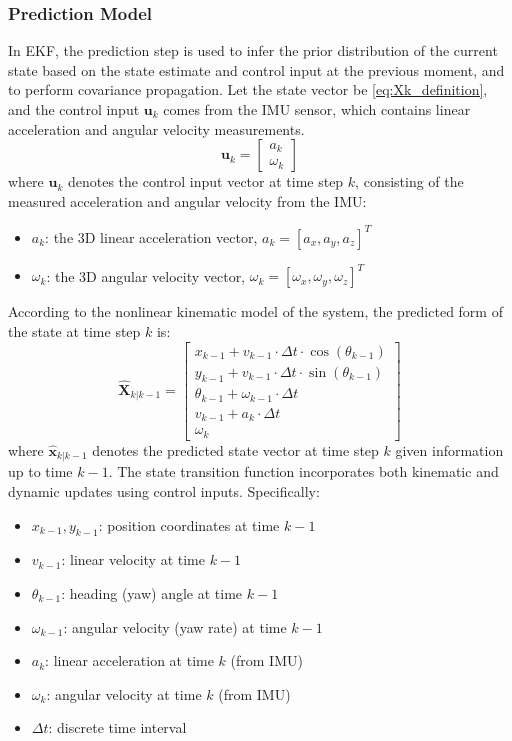 \documentclass[12pt,a4paper]{article}
\numberwithin{equation}{section}
\begin{document}
\subsubsection{Prediction Model}
In EKF, the prediction step is used to infer the prior distribution of the
current state based on the state estimate and control input at the previous
moment, and to perform covariance propagation. Let the state vector be
\autoref{eq:Xk_definition}, and the control input $\mathbf{u}_k$ comes from the
IMU sensor, which contains linear acceleration and angular velocity
measurements.
\begin{equation}
  \mathbf{u}_k = 
  \begin{bmatrix}
    a_k \\
    \omega_k
  \end{bmatrix}
  \label{eq:control_input}
\end{equation}
where $\mathbf{u}_k$ denotes the control input vector at time step $k$,
consisting of the measured acceleration and angular velocity from the IMU:
\begin{itemize}
\item $a_k$: the 3D linear acceleration vector, $a_k = [a_x, a_y, a_z]^T$
\item $\omega_k$: the 3D angular velocity vector,
  $\omega_k = [\omega_x, \omega_y, \omega_z]^T$
\end{itemize}

According to the nonlinear kinematic model of the system, the predicted form of
the state at time step $k$ is:
\begin{equation}
  \hat{\mathbf{X}}_{k|k-1} =
  \begin{bmatrix}
    x_{k-1} + v_{k-1} \cdot \Delta t \cdot \cos(\theta_{k-1}) \\
    y_{k-1} + v_{k-1} \cdot \Delta t \cdot \sin(\theta_{k-1}) \\
    \theta_{k-1} + \omega_{k-1} \cdot \Delta t \\
    v_{k-1} + a_k \cdot \Delta t \\
    \omega_k
  \end{bmatrix}
  \label{eq:state_prediction}
\end{equation}
where $\hat{\mathbf{x}}_{k|k-1}$ denotes the predicted state vector at time step
$k$ given information up to time $k{-}1$. The state transition function
incorporates both kinematic and dynamic updates using control
inputs. Specifically:
\begin{itemize}
\item $x_{k-1}, y_{k-1}$: position coordinates at time $k{-}1$
\item $v_{k-1}$: linear velocity at time $k{-}1$
\item $\theta_{k-1}$: heading (yaw) angle at time $k{-}1$
\item $\omega_{k-1}$: angular velocity (yaw rate) at time $k{-}1$
\item $a_k$: linear acceleration at time $k$ (from IMU)
\item $\omega_k$: angular velocity at time $k$ (from IMU)
\item $\Delta t$: discrete time interval
\end{itemize}
\end{document}
